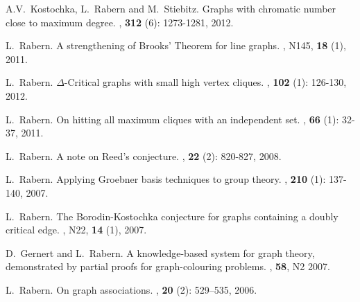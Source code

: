 \documentclass[margin,line]{res}
\begin{document}
\begin{resume}
\begin{enumerate}[{[}1{]}]
\smallskip

\item A.V.~Kostochka, L.~Rabern and M.~Stiebitz.
\newblock Graphs with chromatic number close to maximum degree.
,  \textbf{312} (6): 1273-1281, 2012.

\smallskip

\item L.~Rabern.
\newblock A strengthening of Brooks' Theorem for line graphs.
, N145, \textbf{18} (1), 2011.

\smallskip

\item L.~Rabern.
\newblock $\Delta$-Critical graphs with small high vertex cliques.
, \textbf{102} (1): 126-130, 2012.

\smallskip

\item L.~Rabern. 
\newblock On hitting all maximum cliques with an independent set.
, \textbf{66} (1): 32-37, 2011.

\smallskip

\item L.~Rabern.
\newblock A note on Reed's conjecture.
, \textbf{22} (2): 820-827, 
	2008.

\smallskip

\item L.~Rabern.
\newblock Applying Groebner basis techniques to group theory.
, \textbf{210} (1): 137-140, 2007.

\smallskip

\item
L.~Rabern.
\newblock The Borodin-Kostochka conjecture for graphs containing a doubly critical edge.
, N22, \textbf{14} (1), 2007.

\smallskip

\item
D.~Gernert and L.~Rabern.
\newblock A knowledge-based system for graph theory, demonstrated by partial proofs for graph-colouring problems.
, \textbf{58}, N2 2007.

\smallskip

\item L.~Rabern.
\newblock On graph associations.
, \textbf{20}  (2): 529--535,
  2006.


\end{enumerate}
\end{resume}
\end{document}

